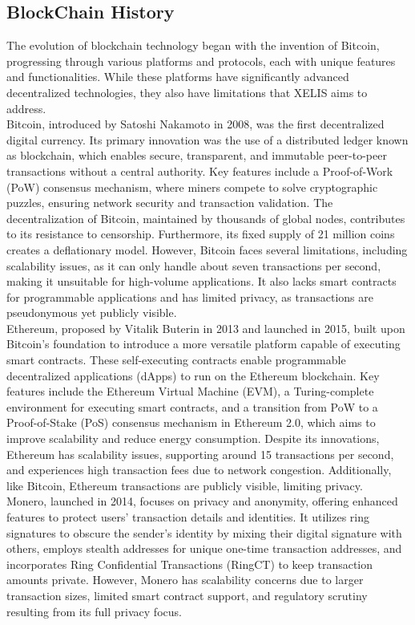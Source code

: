 \documentclass[10pt,a4paper,twocolumn]{article}
\begin{document}
\subsection{BlockChain History}
The evolution of blockchain technology began with the invention of Bitcoin, progressing through various platforms and protocols, each with unique features and functionalities. While these platforms have significantly advanced decentralized technologies, they also have limitations that XELIS aims to address.\\

Bitcoin, introduced by Satoshi Nakamoto in 2008, was the first decentralized digital currency. Its primary innovation was the use of a distributed ledger known as blockchain, which enables secure, transparent, and immutable peer-to-peer transactions without a central authority. Key features include a Proof-of-Work (PoW) consensus mechanism, where miners compete to solve cryptographic puzzles, ensuring network security and transaction validation. The decentralization of Bitcoin, maintained by thousands of global nodes, contributes to its resistance to censorship. Furthermore, its fixed supply of 21 million coins creates a deflationary model. However, Bitcoin faces several limitations, including scalability issues, as it can only handle about seven transactions per second, making it unsuitable for high-volume applications. It also lacks smart contracts for programmable applications and has limited privacy, as transactions are pseudonymous yet publicly visible.\\

Ethereum, proposed by Vitalik Buterin in 2013 and launched in 2015, built upon Bitcoin’s foundation to introduce a more versatile platform capable of executing smart contracts. These self-executing contracts enable programmable decentralized applications (dApps) to run on the Ethereum blockchain. Key features include the Ethereum Virtual Machine (EVM), a Turing-complete environment for executing smart contracts, and a transition from PoW to a Proof-of-Stake (PoS) consensus mechanism in Ethereum 2.0, which aims to improve scalability and reduce energy consumption. Despite its innovations, Ethereum has scalability issues, supporting around 15 transactions per second, and experiences high transaction fees due to network congestion. Additionally, like Bitcoin, Ethereum transactions are publicly visible, limiting privacy.\\

Monero, launched in 2014, focuses on privacy and anonymity, offering enhanced features to protect users' transaction details and identities. It utilizes ring signatures to obscure the sender's identity by mixing their digital signature with others, employs stealth addresses for unique one-time transaction addresses, and incorporates Ring Confidential Transactions (RingCT) to keep transaction amounts private. However, Monero has scalability concerns due to larger transaction sizes, limited smart contract support, and regulatory scrutiny resulting from its full privacy focus.\\
\end{document}
